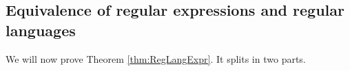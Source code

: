 \subsection{Equivalence of regular expressions and regular languages}
We will now prove Theorem \ref{thm:RegLangExpr}.
It splits in two parts.
